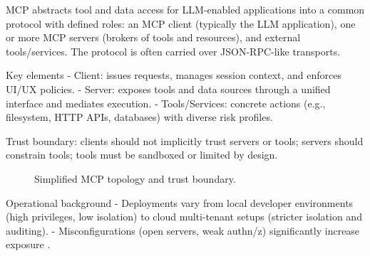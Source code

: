 MCP abstracts tool and data access for LLM-enabled applications into a common protocol with defined roles: an MCP client (typically the LLM application), one or more MCP servers (brokers of tools and resources), and external tools/services. The protocol is often carried over JSON-RPC-like transports.

Key elements
- Client: issues requests, manages session context, and enforces UI/UX policies.
- Server: exposes tools and data sources through a unified interface and mediates execution.
- Tools/Services: concrete actions (e.g., filesystem, HTTP APIs, databases) with diverse risk profiles.

Trust boundary: clients should not implicitly trust servers or tools; servers should constrain tools; tools must be sandboxed or limited by design.

\begin{figure}[h]
\centering
{}
\caption{Simplified MCP topology and trust boundary.}
\label{fig:mcp-arch}
\end{figure}

Operational background
- Deployments vary from local developer environments (high privileges, low isolation) to cloud multi-tenant setups (stricter isolation and auditing).
- Misconfigurations (open servers, weak authn/z) significantly increase exposure \cite{MDPIElectronics3267}.

